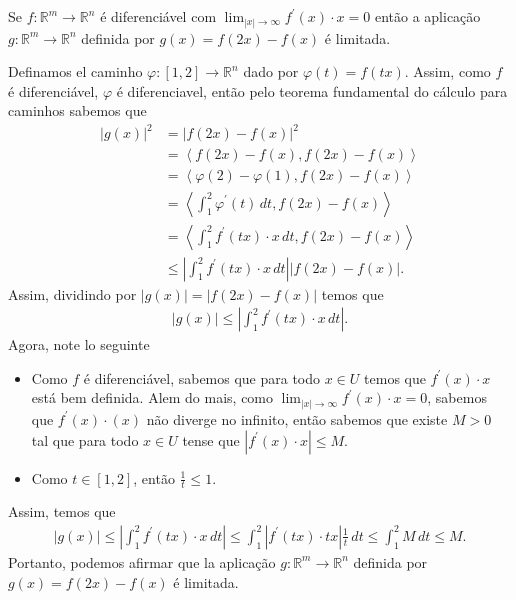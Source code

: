 \begin{homeworkProblem}[Seção 3-6]
  Se $f:\mathbb{R}^{m}\to\mathbb{R}^{n}$ é diferenciável com $\displaystyle \lim_{|x| \to \infty}f^{\prime}(x)\cdot x=0$ então a aplicação $g:\mathbb{R}^{m}\to\mathbb{R}^{n}$ definida por $g(x)=f(2x)-f(x)$ é limitada. 
  \begin{solution}
    Definamos el caminho $\varphi:[1,2]\to\mathbb{R}^{n}$ dado por $\varphi(t)=f(tx)$. Assim, como $f$ é diferenciável, $\varphi$ é diferenciavel, então pelo teorema fundamental do cálculo para caminhos sabemos que
    \begin{align*}
      |g(x)|^{2}&=|f(2x)-f(x)|^{2}\\
      &=\left\langle f(2x)-f(x),f(2x)-f(x) \right\rangle\\
      &=\left\langle \varphi(2)-\varphi(1),f(2x)-f(x) \right\rangle\\
      &=\left\langle \int_{1}^{2}\varphi^{\prime}(t)\,dt, f(2x)-f(x)  \right\rangle\\
      &=\left\langle \int_{1}^{2}f^{\prime}(tx)\cdot x\,dt, f(2x)-f(x) \right\rangle\\
      &\leq \left|\int_{1}^{2}f^{\prime}(tx)\cdot x\,dt\right|\left| f(2x)-f(x) \right|.
    \end{align*}
    Assim, dividindo por $|g(x)|=|f(2x)-f(x)|$ temos que 
    \begin{align*}
      |g(x)|\leq \left| \int_{1}^{2}f^{\prime}(tx)\cdot x\,dt \right|.
    \end{align*}
    Agora, note lo seguinte
    \begin{itemize}
      \item Como $f$ é diferenciável, sabemos que para todo $x\in U$ temos que $f^{\prime}(x)\cdot x$ está bem definida. Alem do mais, como $\displaystyle \lim_{|x| \to \infty}f^{\prime}(x)\cdot x=0$, sabemos que $f^{\prime}(x)\cdot (x)$ não diverge no infinito, então sabemos que existe $M>0$ tal que para todo $x\in U$ tense que $\left|f^{\prime}(x)\cdot x\right|\leq M$.
      \item Como $t\in[1,2]$, então $\displaystyle \frac{1}{t}\leq 1$.
    \end{itemize}
    Assim, temos que
    \begin{align*}
      |g(x)|\leq \left| \int_{1}^{2}f^{\prime}(tx)\cdot x\,dt \right|\leq \int_{1}^{2}|f^{\prime}(tx)\cdot tx|\frac{1}{t}\,dt\leq \int_{1}^{2}M\,dt\leq M.
    \end{align*}
    Portanto, podemos afirmar que la aplicação $g:\mathbb{R}^{m}\to\mathbb{R}^{n}$ definida por $g(x)=f(2x)-f(x)$ é limitada. 
  \end{solution}
\end{homeworkProblem}
